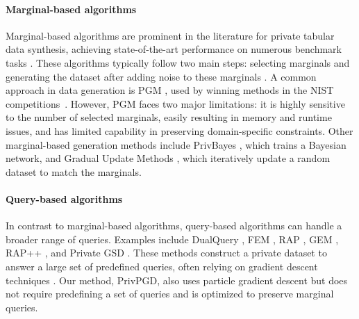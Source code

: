 \paragraph{Marginal-based algorithms} Marginal-based algorithms are prominent in the literature for private tabular data synthesis, achieving state-of-the-art performance on numerous benchmark tasks \citep{mst, tao2021benchmarking, hu2023sok}. These algorithms typically follow two main steps: selecting marginals \citep{cai2021data, mst, aim} and generating the dataset after adding noise to these marginals \citep{zhang2017privbayes, mckenna2019graphical, li2021dpsyn}. A common approach in data generation is PGM \citep{mckenna2019graphical}, used by winning methods in the NIST competitions~\citep{cai2021data, mst, aim}. However, PGM faces two major limitations: it is highly sensitive to the number of selected marginals, easily resulting in memory and runtime issues, and has limited capability in preserving domain-specific constraints. Other marginal-based generation methods include PrivBayes \citep{zhang2017privbayes}, which trains a Bayesian network, and Gradual Update Methods \citep{li2021dpsyn, zhang2021privsyn}, which iteratively update a random dataset to match the marginals.

\paragraph{Query-based algorithms} In contrast to marginal-based algorithms, query-based algorithms can handle a broader range of queries. Examples include DualQuery \citep{gaboardi14}, FEM \citep{vietri2020new}, RAP \citep{aydore2021differentially}, GEM \citep{liu2021iterative}, RAP++ \citep{vietri2022private}, and Private GSD \citep{pmlr-v202-liu23ag}. These methods construct a private dataset to answer a large set of predefined queries, often relying on gradient descent techniques \citep{aydore2021differentially, liu2021iterative}. Our method, PrivPGD, also uses particle gradient descent but does not require predefining a set of queries and is optimized to preserve marginal queries.

